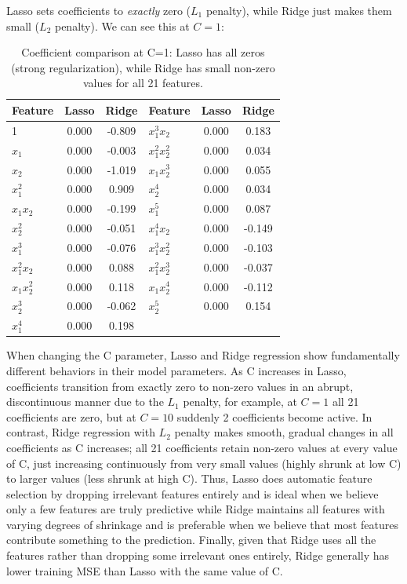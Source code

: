 \documentclass[11pt,a4paper]{article}
\begin{document}
Lasso sets coefficients to \textit{exactly} zero ($L_1$ penalty), while Ridge just makes them small ($L_2$ penalty). We can see this at $C=1$:

\begin{table}[H]
\centering
\small
\begin{tabular}{lcc|lcc}
\toprule
Feature & Lasso & Ridge & Feature & Lasso & Ridge \\
\midrule
1 & 0.000 & -0.809 & $x_1^3x_2$ & 0.000 & 0.183 \\
$x_1$ & 0.000 & -0.003 & $x_1^2x_2^2$ & 0.000 & 0.034 \\
$x_2$ & 0.000 & -1.019 & $x_1x_2^3$ & 0.000 & 0.055 \\
$x_1^2$ & 0.000 & 0.909 & $x_2^4$ & 0.000 & 0.034 \\
$x_1x_2$ & 0.000 & -0.199 & $x_1^5$ & 0.000 & 0.087 \\
$x_2^2$ & 0.000 & -0.051 & $x_1^4x_2$ & 0.000 & -0.149 \\
$x_1^3$ & 0.000 & -0.076 & $x_1^3x_2^2$ & 0.000 & -0.103 \\
$x_1^2x_2$ & 0.000 & 0.088 & $x_1^2x_2^3$ & 0.000 & -0.037 \\
$x_1x_2^2$ & 0.000 & 0.118 & $x_1x_2^4$ & 0.000 & -0.112 \\
$x_2^3$ & 0.000 & -0.062 & $x_2^5$ & 0.000 & 0.154 \\
$x_1^4$ & 0.000 & 0.198 & & & \\
\bottomrule
\end{tabular}
\caption*{Coefficient comparison at C=1: Lasso has all zeros (strong regularization), while Ridge has small non-zero values for all 21 features.}
\end{table}

When changing the C parameter, Lasso and Ridge regression show fundamentally different behaviors in their model parameters. As C increases in Lasso, coefficients transition from exactly zero to non-zero values in an abrupt, discontinuous manner due to the $L_1$ penalty, for example, at $C=1$ all 21 coefficients are zero, but at $C=10$ suddenly 2 coefficients become active. In contrast, Ridge regression with $L_2$ penalty makes smooth, gradual changes in all coefficients as C increases; all 21 coefficients retain non-zero values at every value of C, just increasing continuously from very small values (highly shrunk at low C) to larger values (less shrunk at high C). Thus, Lasso does automatic feature selection by dropping irrelevant features entirely and is ideal when we believe only a few features are truly predictive while Ridge maintains all features with varying degrees of shrinkage and is preferable when we believe that most features contribute something to the prediction. Finally, given that Ridge uses all the features rather than dropping some irrelevant ones entirely, Ridge generally has lower training MSE than Lasso with the same value of C.
\end{document}
